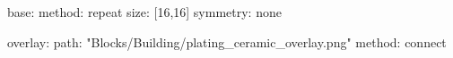 base:
  method: repeat
  size: [16,16]
  symmetry: none

overlay:
  path: "Blocks/Building/plating_ceramic_overlay.png"
  method: connect